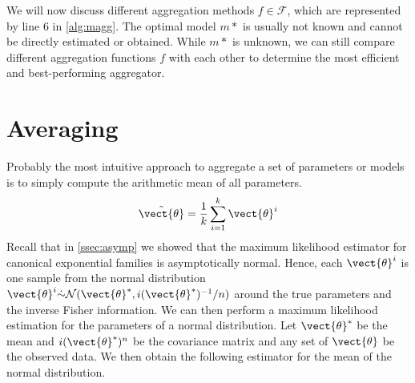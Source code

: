 We will now discuss different aggregation methods $f \in \mathcal{F}$, which are represented by line 6 in \autoref{alg:magg}.
The optimal model $m*$ is usually not known and cannot be directly estimated or obtained.
While  $m*$ is unknown, we can still compare different aggregation functions $f$ with each other to determine the most efficient and best-performing aggregator.


\section{Averaging}

Probably the most intuitive approach to aggregate a set of parameters or models is to simply compute the  arithmetic mean of all parameters.
\begin{equation}
    \label{eq:arithmean}
    \tilde{\vect{\theta}} = \frac{1}{k} \sum_{i=1}^k \vect{\theta}^i
\end{equation}
Recall that in \autoref{ssec:asymp} we showed that the maximum likelihood estimator for canonical exponential families is asymptotically normal.
Hence, each $\vect{\theta}^i$ is one sample from the normal distribution $\vect{\theta}^i \dot{\sim} \mathcal{N}(\vect{\theta}^*, i(\vect{\theta}^*)^{-1}/n)$ around the true parameters and the inverse Fisher information.
We can then perform a maximum likelihood estimation for the parameters of a normal distribution. 
Let $\vect{\theta}^*$ be the mean and $i(\vect{\theta}^*)^n$ be the covariance matrix and any set of $\vect{\theta}$ be the observed data.
We then obtain the following estimator for the mean of the normal distribution.

